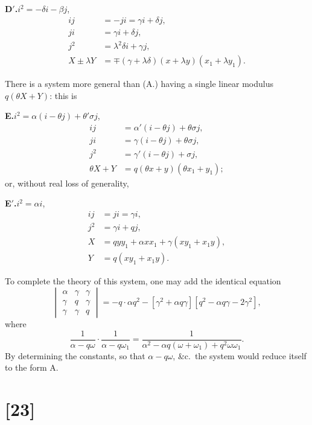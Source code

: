 \documentclass[11pt,a4paper]{book}
\begin{document}
\medskip
\textbf{D$'$.}\quad $i^2 = -\delta i - \beta j$,
\begin{align*}
ij &= -ji = \gamma i + \delta j,\\
ji &= \gamma i + \delta j,\\
j^2 &= \lambda^2\delta i + \gamma j,\\
X \pm \lambda Y &= \mp (\gamma + \lambda\delta)(x + \lambda y)(x_1 + \lambda y_1).
\end{align*}

There is a system more general than (A.) having a single linear modulus $q(\theta X + Y)$:
this is

\medskip
\textbf{E.}\quad $i^2 = \alpha(i - \theta j) + \theta'\sigma j$,
\begin{align*}
ij &= \alpha'(i - \theta j) + \theta\sigma j,\\
ji &= \gamma(i - \theta j) + \theta\sigma j,\\
j^2 &= \gamma'(i - \theta j) + \sigma j,\\
\theta X + Y &= q(\theta x + y)(\theta x_1 + y_1);
\end{align*}
or, without real loss of generality,

\newpage
\setcounter{page}{131}

\medskip
\textbf{E$'$.}\quad $i^2 = \alpha i$,
\begin{align*}
ij &= ji = \gamma i,\\
j^2 &= \gamma i + q j,\\
X &= q y y_1 + \alpha x x_1 + \gamma(xy_1 + x_1y),\\
Y &= q(xy_1 + x_1y).
\end{align*}

To complete the theory of this system, one may add the identical equation
\[
\begin{vmatrix}
\alpha & \gamma & \gamma \\
\gamma & q & \gamma \\
\gamma & \gamma & q
\end{vmatrix}
= -q \cdot \alpha q^2 - [\gamma^2 + \alpha q\gamma] [q^2 - \alpha q\gamma - 2\gamma^2],
\]
where
\[
\frac{1}{\alpha - q\omega} \cdot \frac{1}{\alpha - q\omega_1} = \frac{1}{\alpha^2 - \alpha q(\omega + \omega_1) + q^2 \omega\omega_1}.
\]
By determining the constants, so that $\alpha - q\omega$, \&c.\ the system would
reduce itself to the form A.

\newpage
\section*{[23]}
\end{document}
